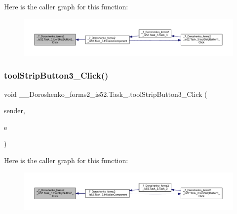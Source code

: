 Here is the caller graph for this function\+:
\nopagebreak
\begin{figure}[H]
\begin{center}
\leavevmode
\includegraphics[width=350pt]{class__7___doroshenko__forms2__is52_1_1_task__3_afe243424d82afcfa1257f933e7e0017c_icgraph}
\end{center}
\end{figure}
\hypertarget{class__7___doroshenko__forms2__is52_1_1_task__3_ac6fdfc533df728ff11be054ad2008c84}{}\label{class__7___doroshenko__forms2__is52_1_1_task__3_ac6fdfc533df728ff11be054ad2008c84} 
\subsubsection{\texorpdfstring{tool\+Strip\+Button3\+\_\+\+Click()}{toolStripButton3\_Click()}}
{\footnotesize\ttfamily void \+\_\+\_\+\+Doroshenko\+\_\+forms2\+\_\+is52.\+Task\+\_.\+tool\+Strip\+Button3\+\_\+\+Click (\begin{DoxyParamCaption}\item[{object}]{sender,  }\item[{Event\+Args}]{e }\end{DoxyParamCaption})\hspace{0.3cm}{\ttfamily [private]}}

Here is the caller graph for this function\+:
\nopagebreak
\begin{figure}[H]
\begin{center}
\leavevmode
\includegraphics[width=350pt]{class__7___doroshenko__forms2__is52_1_1_task__3_ac6fdfc533df728ff11be054ad2008c84_icgraph}
\end{center}
\end{figure}


